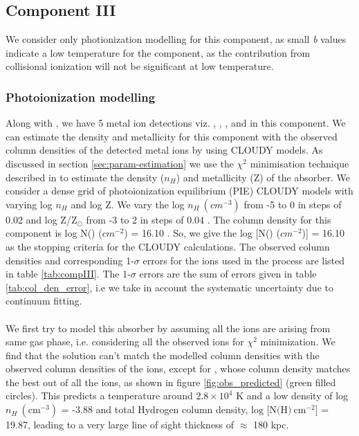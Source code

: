 \subsection{Component III} \label{sec:compIII_modelling}

We consider only photionization modelling for this component, as small \emph{b} values indicate a low temperature for the component, as the contribution from collisional ionization will not be significant at low temperature.

\subsubsection{Photoionization modelling} \label{sec:compIII_PIE}

Along with , we have 5 metal ion detections viz. , , ,  and  in this component. We can estimate the density and metallicity for this component with the observed column densities of the detected metal ions by using CLOUDY models. As discussed in section \ref{sec:param-estimation} we use the $\chi^2$ minimisation technique described in \cite{acharya_khaire} to estimate the density ($n_H$) and metallicity (Z) of the absorber. We consider a dense grid of photoionization equilibrium (PIE) CLOUDY models with varying log $n_H$ and log Z. We vary the log $n_H \ ({cm}^{-3})$ from -5 to 0 in steps of 0.02 and log Z/${\text{Z}_\odot}$ from -3 to 2 in steps of 0.04 . The  column density for this component is log N() (${cm}^{-2}$) = 16.10 . So, we give the log [N() (${cm}^{-2}$)] = 16.10 as the stopping criteria for the CLOUDY calculations. The observed column densities and corresponding 1-$\sigma$ errors for the ions used in the process are listed in table \ref{tab:compIII}. The 1-$\sigma$ errors are the sum of errors given in table \ref{tab:col_den_error}, i.e we take in account the systematic uncertainty due to continuum fitting.
\\\\
We first try to model this absorber by assuming all the ions are arising from same gas phase, i.e. considering all the observed ions for $\chi^2$ minimization. We find that the solution can't match the modelled column densities with the observed column densities of the ions, except for , whose column density matches the best out of all the ions, as shown in figure \ref{fig:obs_predicted} (green filled circles). This predicts a temperature around $2.8\times 10^4$ K and a low density of log $n_H \ (\text{cm}^{-3})$ = -3.88 and total Hydrogen column density, $\text{log [N(H)} \ \text{cm}^{-2}]$ = 19.87, leading to a very large line of sight thickness of $\approx$ 180 kpc. 

